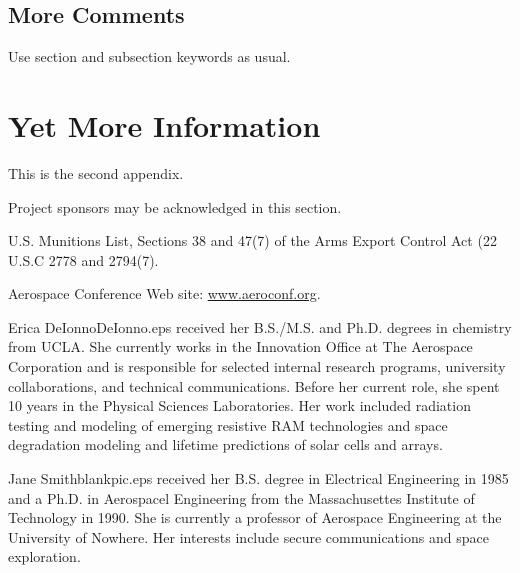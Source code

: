 \documentclass[twocolumn,letterpaper]{IEEEAerospaceCLS}  %
\begin{document}
\subsection{More Comments}
Use section and subsection keywords as usual.

\section{Yet More Information}    %
This is the second appendix.



\acknowledgments
Project sponsors may be acknowledged in this section. 




%
\begin{thebibliography}{1}

U.S. Munitions List, Sections 38 and 47(7) of the Arms Export Control Act (22 U.S.C 2778 and 2794(7).

Aerospace Conference Web site: \underline{www.aeroconf.org}.

\end{thebibliography}


\thebiography
\begin{biographywithpic}
{Erica DeIonno}{DeIonno.eps}
received her B.S./M.S. and Ph.D. degrees in chemistry from UCLA. She currently works in the Innovation Office at The Aerospace Corporation and is responsible for selected internal research programs, university collaborations, and technical communications. Before her current role, she spent 10 years in the Physical Sciences Laboratories. Her work included radiation testing and modeling of emerging resistive RAM technologies and space degradation modeling and lifetime predictions of solar cells and arrays.
\end{biographywithpic} 

\begin{biographywithpic}
{Jane Smith}{blankpic.eps}
received her B.S. degree in Electrical Engineering in 1985 and a Ph.D. in Aerospacel Engineering from the Massachusettes Institute of Technology in 1990. She is currently a professor of Aerospace Engineering at the University of Nowhere. Her interests include secure communications and space exploration.

\end{biographywithpic}
\end{document}
